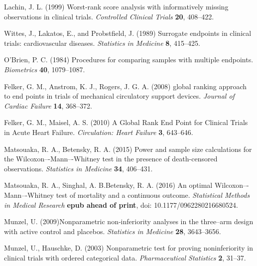 \documentclass[bimj,fleqn]{w-art}\usepackage[]{graphicx}\usepackage[]{color}
\theoremstyle{plain}
\theoremstyle{definition}
\begin{document}
\begin{thebibliography}{10}

 Lachin, J. L. (1999) Worst-rank score
analysis with informatively missing observations in clinical trials.
\textit{Controlled Clinical Trials} \textbf{20}, 408--422.

Wittes, J., Lakatos, E., and Probstfield, J. (1989) Surrogate endpoints in
clinical trials: cardiovascular diseases. \textit{Statistics in Medicine}
\textbf{8}, 415--425.

 O'Brien, P. C. (1984) Procedures
for comparing samples with multiple endpoints. \textit{Biometrics}
\textbf{40}, 1079--1087.

Felker, G. M., Anstrom, K. J., Rogers, J. G. A. (2008) global ranking approach
to end points in trials of mechanical circulatory support devices.
\textit{Journal of Cardiac Failure} \textbf{14}, 368--372.

 Felker, G. M.,
Maisel, A. S. (2010) A Global Rank End Point for Clinical Trials in Acute Heart
Failure. \textit{Circulation: Heart Failure} \textbf{3}, 643--646.

Matsouaka, R. A., Betensky, R. A. (2015) Power and sample size calculations for
the Wilcoxon–-Mann–-Whitney test in the presence of death-censored observations.
\textit{Statistics in Medicine} \textbf{34}, 406--431.

Matsouaka, R. A., Singhal, A. B.Betensky, R. A. (2016) An optimal
Wilcoxon–-Mann–-Whitney test of mortality and a continuous outcome.
\textit{Statistical Methods in Medical Research}
\textbf{epub ahead of print},  doi: 10.1177/0962280216680524.

Munzel, U. (2009)Nonparametric non‐inferiority analyses in the three--arm design
with active control and placebos.
\textit{Statistics in Medicine} \textbf{28}, 3643--3656.

Munzel, U., Hauschke, D. (2003) Nonparametric test for proving noninferiority in clinical trials with ordered categorical data.
\textit{Pharmaceutical Statistics} \textbf{2}, 31--37.


\end{thebibliography}
\end{document}
